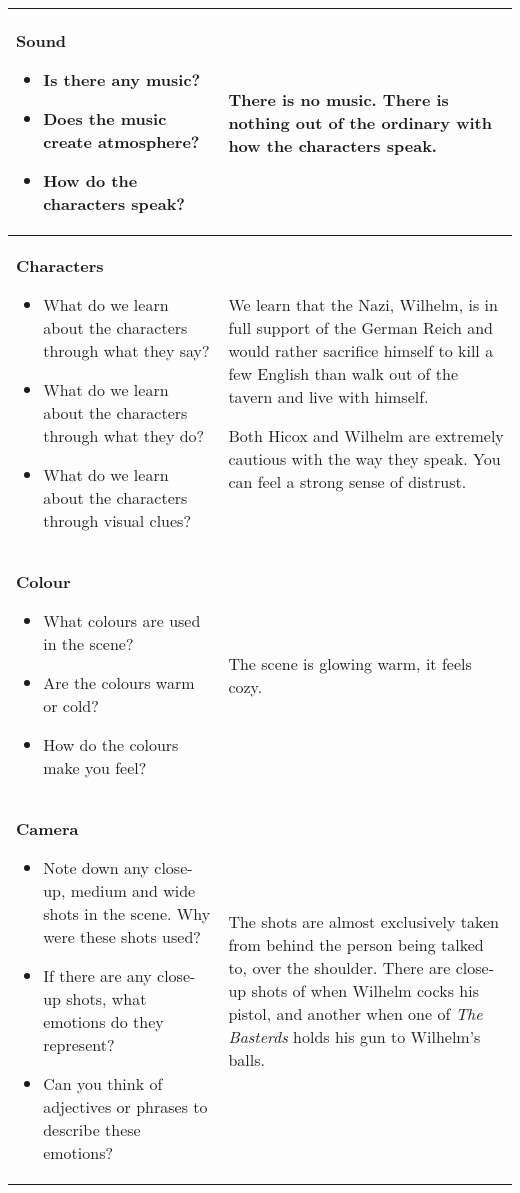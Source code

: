 \documentclass[notitlepage]{fhnwreport}
\begin{document}
\begin{center}
    \begin{threeparttable}
        \begin{tabular}{p{6.8cm}p{8.2cm}}

\midrule
\textbf{Sound}
\begin{itemize}
    \item Is there any music?
    \item Does the music create atmosphere?
    \item How do the characters speak?
\end{itemize} &
There  is  no  music.  There  is  nothing out of the  ordinary  with  how  the
characters speak. 
\\

\midrule
\textbf{Characters}
\begin{itemize}
    \item What do we learn about the characters through what they say?
    \item What do we learn about the characters through what they do?
    \item What do we learn about the characters through visual clues?
\end{itemize} &
We  learn  that the Nazi, Wilhelm, is in full support of the German Reich  and
would rather sacrifice himself to kill a few English  than  walk  out  of  the
tavern and live with himself.

Both Hicox and Wilhelm are extremely cautious with the way they speak. You can
feel a strong sense of distrust.
\\

\midrule
\textbf{Colour}
\begin{itemize}
    \item What colours are used in the scene?
    \item Are the colours warm or cold?
    \item How do the colours make you feel?
\end{itemize} &
The scene is glowing warm, it feels cozy.
\\

\midrule
\textbf{Camera}
\begin{itemize}
    \item Note down any close-up, medium and wide shots in the scene. Why were these shots used?
    \item If there are any close-up shots, what emotions do they represent?
    \item Can you think of adjectives or phrases to describe these emotions?
\end{itemize} &
The shots are almost exclusively taken from behind the person being talked to,
over the shoulder. There are close-up  shots of when Wilhelm cocks his pistol,
and  another  when  one of \textit{The Basterds} holds his  gun  to  Wilhelm's
balls.


\end{tabular}
\end{threeparttable}
\end{center}
\end{document}
